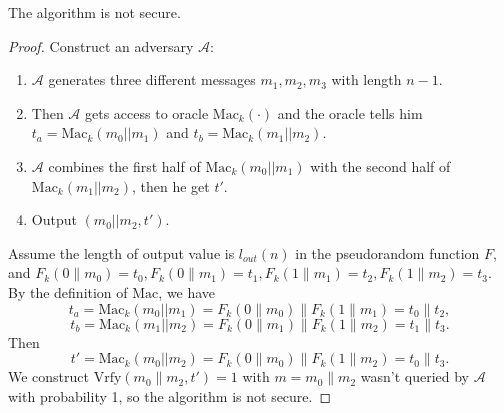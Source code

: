 \documentclass[12pt]{article}
\newcommand{\Mac}{\text{Mac}}
\newcommand{\Vrfy}{\text{Vrfy}}
\newcommand{\A}{\mathcal{A}}
\newenvironment{problem}[2][Problem]{\begin{trivlist}
\item[\hskip \labelsep {\bfseries #1}\hskip \labelsep {\bfseries #2.}]}{\end{trivlist}}
\begin{document}
\begin{problem}{4.6}
The algorithm is not secure.\par
\begin{proof}
Construct an adversary $\A$:
\begin{enumerate}
    \item $\A$ generates three different messages $m_1,m_2,m_3$ with length $n-1$.
    \item Then $\A$ gets access to oracle $\Mac_k(\cdot)$ and the oracle tells him $t_a=\Mac_k(m_0||m_1)$ and $t_b=\Mac_k(m_1||m_2)$. 
    \item $\A$ combines the first half of $\Mac_k(m_0||m_1)$ with the second half of $\Mac_k(m_1||m_2)$, then he get $t'$. 
    \item Output $(m_0||m_2, t')$.
\end{enumerate}
Assume the length of output value is $l_{out}(n)$ in the pseudorandom function $F$, and $F_k(0\|m_0)=t_0,F_k(0\|m_1)=t_1,F_k(1\|m_1)=t_2,F_k(1\|m_2)=t_3$. By the definition of $\Mac$, we have $$t_a=\Mac_k(m_0||m_1)=F_k(0\|m_0)\|F_k(1\|m_1)=t_0\|t_2,$$
$$t_b=\Mac_k(m_1||m_2)=F_k(0\|m_1)\|F_k(1\|m_2)=t_1\|t_3.$$
Then 
$$t'=\Mac_k(m_0||m_2)=F_k(0\|m_0)\|F_k(1\|m_2)=t_0\|t_3.$$
We construct $\Vrfy(m_0\|m_2,t')=1$ with $m=m_0\|m_2$ wasn't queried by $\A$ with probability 1, so the algorithm is not secure.
\end{proof}
\end{problem}
\end{document}
